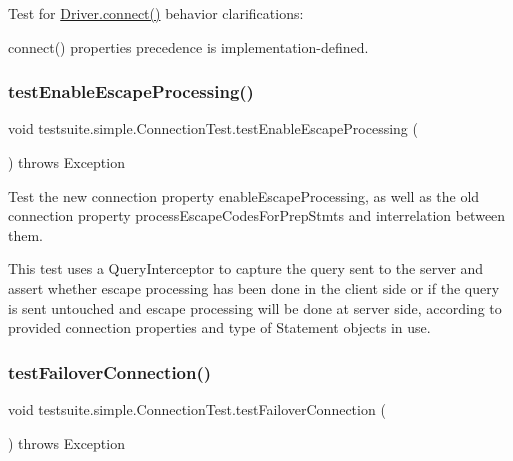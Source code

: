 Test for \mbox{\hyperlink{classcom_1_1mysql_1_1cj_1_1jdbc_1_1_non_registering_driver_ab3fd3d522550db032eab6c240b554e3e}{Driver.\+connect()}} behavior clarifications\+:
\begin{DoxyItemize}
\item connect() properties precedence is implementation-\/defined. 
\end{DoxyItemize}\mbox{\label{classtestsuite_1_1simple_1_1_connection_test_a64fec8e4893bf266e66b4f59ceeb323f}} 
\subsubsection{\texorpdfstring{test\+Enable\+Escape\+Processing()}{testEnableEscapeProcessing()}}
{\footnotesize\ttfamily void testsuite.\+simple.\+Connection\+Test.\+test\+Enable\+Escape\+Processing (\begin{DoxyParamCaption}{ }\end{DoxyParamCaption}) throws Exception}

Test the new connection property \textquotesingle{}enable\+Escape\+Processing\textquotesingle{}, as well as the old connection property \textquotesingle{}process\+Escape\+Codes\+For\+Prep\+Stmts\textquotesingle{} and interrelation between them.

This test uses a Query\+Interceptor to capture the query sent to the server and assert whether escape processing has been done in the client side or if the query is sent untouched and escape processing will be done at server side, according to provided connection properties and type of Statement objects in use. \mbox{\label{classtestsuite_1_1simple_1_1_connection_test_a6e0b85502950068c4a43a70f70f93a56}} 
\subsubsection{\texorpdfstring{test\+Failover\+Connection()}{testFailoverConnection()}}
{\footnotesize\ttfamily void testsuite.\+simple.\+Connection\+Test.\+test\+Failover\+Connection (\begin{DoxyParamCaption}{ }\end{DoxyParamCaption}) throws Exception}

